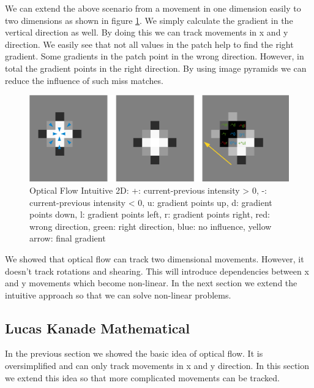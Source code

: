 \documentclass[11pt,a4paper,titlepage,oneside]{report}
\begin{document}
We can extend the above scenario from a movement in one dimension easily to two dimensions as shown in figure \ref{fig:optical_flow_2d}. We simply calculate the gradient in the vertical direction as well. By doing this we can track movements in x and y direction. We easily see that not all values in the patch help to find the right gradient. Some gradients in the patch point in the wrong direction. However, in total the gradient points in the right direction. By using image pyramids we can reduce the influence of such miss matches.
\begin{figure}[H]
	\includegraphics[width=1.0\textwidth]{img/optical_flow_2d.png}
	\caption{Optical Flow Intuitive 2D: +: current-previous intensity > 0, -: current-previous intensity < 0, u: gradient points up, d: gradient points down, l: gradient points left, r: gradient points right, red: wrong direction, green: right direction, blue: no influence, yellow arrow: final gradient}\label{fig:optical_flow_2d}
\end{figure}

We showed that optical flow can track two dimensional movements. However, it doesn't track rotations and shearing. This will introduce dependencies between x and y movements which become non-linear. In the next section we extend the intuitive approach so that we can solve non-linear problems.

\subsection{Lucas Kanade Mathematical}

In the previous section we showed the basic idea of optical flow. It is oversimplified and can only track movements in x and y direction. In this section we extend this idea so that more complicated movements can be tracked.\\
\end{document}
